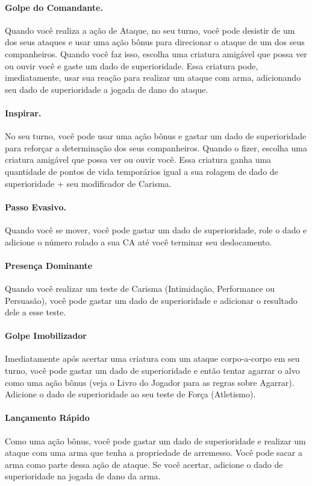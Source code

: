 \documentclass{RPG_Adventure}[2021/10/20]
\begin{document}
\paragraph{Golpe do Comandante.} Quando você realiza a ação de Ataque, no seu
turno, você pode desistir de um dos seus ataques e usar uma ação bônus para
direcionar o ataque de um dos seus companheiros. Quando você faz isso, escolha
uma criatura amigável que possa ver ou ouvir você e gaste um dado de
superioridade. Essa criatura pode, imediatamente, usar sua reação para realizar
um ataque com arma, adicionando seu dado de superioridade a jogada de dano do
ataque.

\paragraph{Inspirar.} No seu turno, você pode usar uma ação bônus e gastar um
dado de superioridade para reforçar a determinação dos seus companheiros. Quando
o fizer, escolha uma criatura amigável que possa ver ou ouvir você. Essa
criatura ganha uma quantidade de pontos de vida temporários igual a sua rolagem
de dado de superioridade + seu modificador de Carisma.

\paragraph{Passo Evasivo.} Quando você se mover, você pode gastar um dado de
superioridade, role o dado e adicione o número rolado a sua CA até você terminar
seu deslocamento.

\paragraph{Presença Dominante} Quando você realizar um teste de Carisma
(Intimidação, Performance ou Persuasão), você pode gastar um dado de
superioridade e adicionar o resultado dele a esse teste.

\paragraph{Golpe Imobilizador} Imediatamente após acertar uma criatura com um
ataque corpo-a-corpo em seu turno, você pode gastar um dado de superioridade e
então tentar agarrar o alvo como uma ação bônus (veja o Livro do Jogador para as
regras sobre Agarrar). Adicione o dado de superioridade ao seu teste de Força
(Atletismo).

\paragraph{Lançamento Rápido} Como uma ação bônus, você pode gastar um dado de
superioridade e realizar um ataque com uma arma que tenha a propriedade de
arremesso. Você pode sacar a arma como parte dessa ação de ataque. Se você
acertar, adicione o dado de superioridade na jogada de dano da arma.
\end{document}
